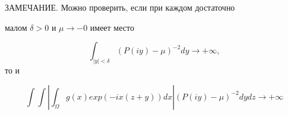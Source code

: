 \vskip 2cm












\label{end}








ЗАМЕЧАНИЕ. Можно проверить, если при каждом достаточно


малом $\delta >0$ и $\mu \to -0$ имеет место


$$ \int _{| y | < \delta } (P(iy)-\mu)^{-2} dy


\to +\infty, $$ то и


$$ \int \int | \int _{\Omega} g(x) exp (-ix(z+y))


dx | (P(iy)-\mu)^{-2} dy dz \to +\infty $$





